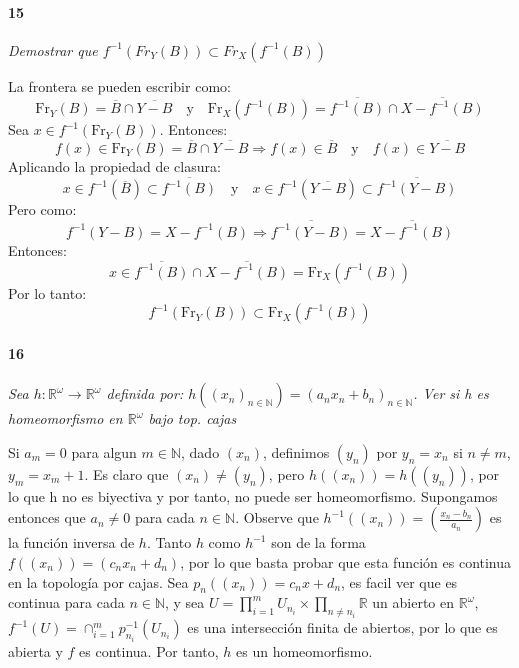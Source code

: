 \documentclass[12pt]{article}
\begin{document}
\paragraph{15}
\textit{Demostrar que $f^{-1}(Fr_Y(B))\subset Fr_X(f^{-1}(B))$}

La frontera se pueden escribir como:
\[
\mathrm{Fr}_Y(B) = \overline{B} \cap \overline{Y - B}
\quad \text{y} \quad
\mathrm{Fr}_X(f^{-1}(B)) = \overline{f^{-1}(B)} \cap \overline{X - f^{-1}(B)}
\]
Sea \( x \in f^{-1}(\mathrm{Fr}_Y(B)) \).  
Entonces:
\[
f(x) \in \mathrm{Fr}_Y(B) = \overline{B} \cap \overline{Y - B}
\Rightarrow
f(x) \in \overline{B} \quad \text{y} \quad f(x) \in \overline{Y - B}
\]
Aplicando la propiedad de clasura:
\[
x \in f^{-1}(\overline{B}) \subset \overline{f^{-1}(B)}
\quad \text{y} \quad
x \in f^{-1}(\overline{Y - B}) \subset \overline{f^{-1}(Y - B)}
\]
Pero como:
\[
f^{-1}(Y - B) = X - f^{-1}(B)
\Rightarrow
\overline{f^{-1}(Y - B)} = \overline{X - f^{-1}(B)}
\]
Entonces:
\[
x \in \overline{f^{-1}(B)} \cap \overline{X - f^{-1}(B)} = \mathrm{Fr}_X(f^{-1}(B))
\]
Por lo tanto:
\[
f^{-1}(\mathrm{Fr}_Y(B)) \subset \mathrm{Fr}_X(f^{-1}(B))
\]

\paragraph{16}
\textit{Sea $h:\mathbb{R}^\omega\rightarrow\mathbb{R}^\omega$ definida por: $h((x_n)_{n\in\mathbb{N}})=(a_n x_n +b_n)_{n\in\mathbb{N}}$. Ver si h es homeomorfismo en $\mathbb{R}^\omega$ bajo top. cajas}

Si $a_m=0$ para algun $m \in \mathbb{N}$, dado $(x_n)$, definimos $(y_n)$ por $y_n=x_n$ si $n \neq m$, $y_m=x_m+1$. Es claro que $(x_n) \neq (y_n)$, pero $h((x_n))=h((y_n))$, por lo que h no es biyectiva y por tanto, no puede ser homeomorfismo.
Supongamos entonces que $a_n \neq 0$ para cada $n \in \mathbb{N}$. Observe que $h^{-1}((x_n))=(\frac{x_n-b_n}{a_n})$ es la función inversa de $h$. Tanto $h$ como $h^{-1}$ son de la forma $f((x_n))=(c_n x_n+d_n)$, por lo que basta probar que esta función
es continua en la topología por cajas. Sea $p_n((x_n))=c_nx+d_n$, es facil ver que es continua para cada $n \in \mathbb{N}$, y sea $U=\prod_{i=1}^{m} U_{n_i} \times \prod_{n\neq n_i} \mathbb{R}$ un abierto en $\mathbb{R}^\omega$,  $f^{-1}(U)=\cap_{i=1}^{m} p^{-1}_{n_i}(U_{n_i})$ es una
intersección finita de abiertos, por lo que es abierta y $f$ es continua. Por tanto, $h$ es un homeomorfismo.
\end{document}
